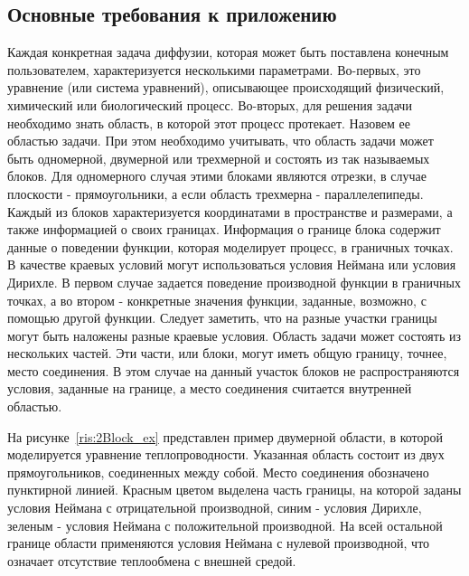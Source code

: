 \documentclass[a4paper, 14pt]{extarticle}
\theoremstyle{definition}
\begin{document}
\subsection{Основные требования к приложению}

\par Каждая конкретная задача диффузии, которая может быть поставлена конечным пользователем, характеризуется несколькими параметрами. Во-первых, это уравнение (или система уравнений), описывающее происходящий физический, химический или биологический процесс. Во-вторых, для решения задачи необходимо знать область, в которой этот процесс протекает. Назовем ее областью задачи. При этом необходимо учитывать, что область задачи может быть одномерной, двумерной или трехмерной и состоять из так называемых блоков. Для одномерного случая этими блоками являются отрезки, в случае плоскости - прямоугольники, а если область трехмерна - параллелепипеды. Каждый из блоков характеризуется координатами в пространстве и размерами, а также информацией о своих границах. Информация о границе блока содержит данные о поведении функции, которая моделирует процесс, в граничных точках. В качестве краевых условий могут использоваться условия Неймана или условия Дирихле. В первом случае задается поведение производной функции в граничных точках, а во втором - конкретные значения функции, заданные, возможно, с помощью другой функции. Следует заметить, что на разные участки границы могут быть наложены разные краевые условия. Область задачи может состоять из нескольких частей. Эти части, или блоки, могут иметь общую границу, точнее, место соединения. В этом случае на данный участок блоков не распространяются условия, заданные на границе, а место соединения считается внутренней областью.

\par На рисунке~\ref{ris:2Block_ex} представлен пример двумерной области, в которой моделируется уравнение теплопроводности. Указанная область состоит из двух прямоугольников, соединенных между собой. Место соединения обозначено пунктирной линией. Красным цветом выделена часть границы, на которой заданы условия Неймана с отрицательной производной, синим - условия Дирихле, зеленым - условия Неймана с положительной производной. На всей остальной границе области применяются условия Неймана с нулевой производной, что означает отсутствие теплообмена с внешней средой.
\end{document}

